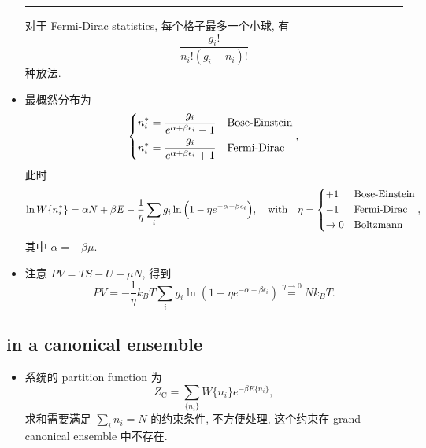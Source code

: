 \begin{itemize}
\begin{tcolorbox}[title=calculation:]
		\noindent\rule[0.5ex]{\linewidth}{0.5pt} %
		
		对于 Fermi-Dirac statistics, 每个格子最多一个小球, 有
		\begin{equation}
			\frac{g_i!}{n_i! (g_i - n_i)!}
		\end{equation}
		种放法.
	\end{tcolorbox}
	
	\item 最概然分布为
	\begin{equation}
		\begin{dcases}
			n_i^* = \frac{g_i}{e^{\alpha + \beta \epsilon_i} - 1} & \text{Bose-Einstein} \\
			n_i^* = \frac{g_i}{e^{\alpha + \beta \epsilon_i} + 1} & \text{Fermi-Dirac}
		\end{dcases},
	\end{equation}
	此时
	\begin{equation}
		\ln W\{n_i^*\} = \alpha N + \beta E - \frac{1}{\eta} \sum_i g_i \ln \Big( 1 - \eta e^{- \alpha - \beta \epsilon_i} \Big), \quad \text{with} \quad \eta = \begin{dcases}
			+ 1 & \text{Bose-Einstein} \\
			- 1 & \text{Fermi-Dirac} \\
			\rightarrow 0 & \text{Boltzmann}
		\end{dcases},
	\end{equation}
	其中 $\alpha = - \beta \mu$.
	
	\item 注意 $P V = T S - U + \mu N$, 得到
	\begin{equation} \label{6.1.8}
		P V = - \frac{1}{\eta} k_B T \sum_i g_i \ln(1 - \eta e^{- \alpha - \beta \epsilon_i}) \overset{\eta \rightarrow 0}{=} N k_B T.
	\end{equation}
\end{itemize}

\subsection{in a canonical ensemble}
\begin{itemize}
	\item 系统的 partition function 为
	\begin{equation}
		Z_\text{C} = \sum_{\{n_i\}} W\{n_i\} e^{- \beta E\{n_i\}},
	\end{equation}
	求和需要满足 $\sum_i n_i = N$ 的约束条件, 不方便处理, 这个约束在 grand canonical ensemble 中不存在.
\end{itemize}

